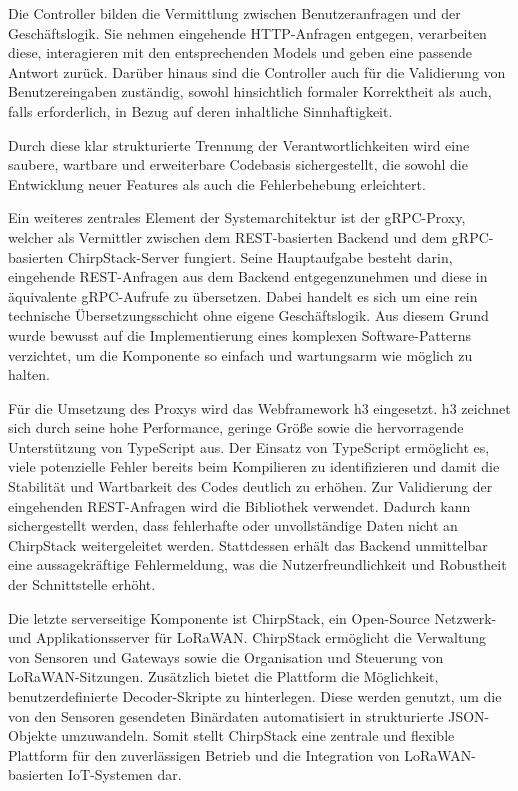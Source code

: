 	Die Controller bilden die Vermittlung zwischen Benutzeranfragen und der Geschäftslogik.
	Sie nehmen eingehende \ac{HTTP}-Anfragen entgegen, verarbeiten diese, interagieren mit den entsprechenden Models
	und geben eine passende Antwort zurück. Darüber hinaus sind die Controller auch für die Validierung von Benutzereingaben zuständig, 
	sowohl hinsichtlich formaler Korrektheit als auch, falls erforderlich, in Bezug auf deren inhaltliche Sinnhaftigkeit.

	Durch diese klar strukturierte Trennung der Verantwortlichkeiten wird eine saubere, wartbare und erweiterbare Codebasis sichergestellt,
	die sowohl die Entwicklung neuer Features als auch die Fehlerbehebung erleichtert.


	Ein weiteres zentrales Element der Systemarchitektur ist der gRPC-Proxy, welcher als Vermittler zwischen dem \ac{REST}-basierten Backend
	und dem gRPC-basierten ChirpStack-Server fungiert. Seine Hauptaufgabe besteht darin, eingehende \ac{REST}-Anfragen aus dem Backend
	entgegenzunehmen und diese in äquivalente gRPC-Aufrufe zu übersetzen. Dabei handelt es sich um eine rein technische Übersetzungsschicht
	ohne eigene Geschäftslogik. Aus diesem Grund wurde bewusst auf die Implementierung eines komplexen Software-Patterns verzichtet,
	um die Komponente so einfach und wartungsarm wie möglich zu halten.

	Für die Umsetzung des Proxys wird das Webframework h3 eingesetzt. h3 zeichnet sich durch seine hohe Performance, geringe Größe
	sowie die hervorragende Unterstützung von TypeScript aus. Der Einsatz von TypeScript ermöglicht es, viele potenzielle
	Fehler bereits beim Kompilieren zu identifizieren und damit die Stabilität und Wartbarkeit des Codes deutlich zu erhöhen.
	Zur Validierung der eingehenden \ac{REST}-Anfragen wird die Bibliothek  verwendet. Dadurch kann sichergestellt werden,
	dass fehlerhafte oder unvollständige Daten nicht an ChirpStack weitergeleitet werden.
	Stattdessen erhält das Backend unmittelbar eine aussagekräftige Fehlermeldung,
	was die Nutzerfreundlichkeit und Robustheit der Schnittstelle erhöht.

	
	Die letzte serverseitige Komponente ist ChirpStack, ein Open-Source Netzwerk- und Applikationsserver für LoRaWAN.
	ChirpStack ermöglicht die Verwaltung von Sensoren und Gateways sowie die Organisation und Steuerung von LoRaWAN-Sitzungen.
	Zusätzlich bietet die Plattform die Möglichkeit, benutzerdefinierte Decoder-Skripte zu hinterlegen. Diese werden genutzt,
	um die von den Sensoren gesendeten Binärdaten automatisiert in strukturierte JSON-Objekte umzuwandeln.
	Somit stellt ChirpStack eine zentrale und flexible Plattform für den zuverlässigen Betrieb
	und die Integration von LoRaWAN-basierten IoT-Systemen dar.


